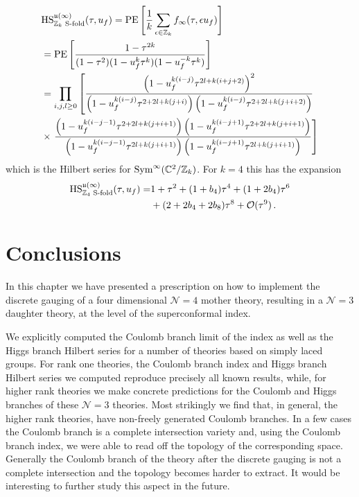 \documentclass[main.tex]{subfiles}
\begin{document}
\begin{equation}
\begin{aligned}
&\textrm{HS}_{\mathbb{Z}_k\text{ S-fold}}^{\mathfrak{u}(\infty)}(\tau,u_f)=\operatorname{\mathrm{PE}}\left[\frac{1}{k}\sum_{\epsilon\in\mathbb{Z}_k}f_{\infty}(\tau,\epsilon u_f)\right]\\
&=\operatorname{\mathrm{PE}}\left[\frac{1-\tau^{2k}}{(1-\tau^2)(1-u_f^k\tau^k)(1-u_f^{-k}\tau^k)}\right]\\
&\begin{aligned}
&=\prod_{i,j,l\geq0}\left[\frac{\left(1-u_f^{k(i-j)}\tau^{2l+k(i+j+2)}\right)^2}{\left(1-u_f^{k(i-j)}\tau^{2+2l+k(j+i)}\right)\left(1-u_f^{k(i-j)}\tau^{2+2l+k(j+i+2)}\right)}\right.\\
&\times\left.\frac{\left(1-u_f^{k(i-j-1)}\tau^{2+2l+k(j+i+1)}\right)\left(1-u_f^{k(i-j+1)}\tau^{2+2l+k(j+i+1)}\right)}{\left(1-u_f^{k(i-j-1)}\tau^{2l+k(j+i+1)}\right)\left(1-u_f^{k(i-j+1)}\tau^{2l+k(j+i+1)}\right)}\right]
\end{aligned}
\end{aligned}
\end{equation}
which is the Hilbert series for $\operatorname{Sym}^{\infty}(\mathbb{C}^2/\mathbb{Z}_k)$. For $k=4$ this has the expansion
\begin{equation}
\begin{aligned}
\textrm{HS}_{\mathbb{Z}_4\text{ S-fold}}^{\mathfrak{u}(\infty)}(\tau,u_f)=&1+\tau^2+(1+b_4)\tau^4+(1+2b_4)\tau^6\\
&+(2+2b_4+2b_8)\tau^8+\mathcal{O}(\tau^9)\,.
\end{aligned}
\end{equation}
\section{Conclusions}
In this chapter we have presented a prescription on how to implement the discrete gauging of a four dimensional $\mathcal{N}=4$ mother theory, resulting in a $\mathcal{N}=3$ daughter theory, at the level of the superconformal index.

We explicitly computed  the Coulomb branch limit of the index as well as the Higgs branch Hilbert series for a number of  theories based on simply laced groups.
For rank one theories, the Coulomb branch index and Higgs branch Hilbert series we computed reproduce precisely all known results, while, for higher rank theories we make concrete predictions for the  Coulomb and Higgs branches of these $\mathcal{N}=3$ theories.
Most strikingly we find that, in general, the higher rank theories, have non-freely generated Coulomb branches. In a few cases the Coulomb branch is a complete intersection variety and, using the Coulomb branch index, we were able to read off the topology of the corresponding space. Generally the Coulomb branch of the theory after the discrete gauging is not a complete intersection and the topology becomes harder to extract. It would be interesting to further study this aspect in the future. 
\end{document}

